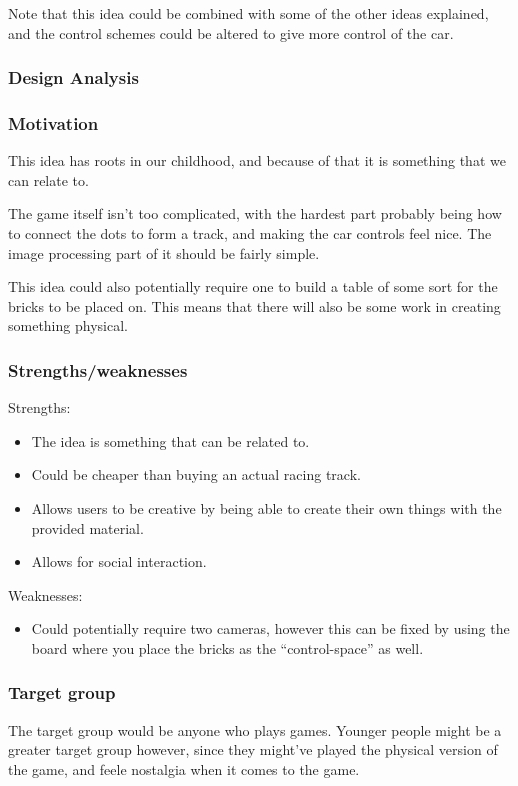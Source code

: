 Note that this idea could be combined with some of the other ideas explained, and the control schemes could be altered to give more control of the car.

\subsubsection*{Design Analysis}
\subsubsection*{Motivation}
This idea has roots in our childhood, and because of that it is something that we can relate to.

The game itself isn’t too complicated, with the hardest part probably being how to connect the dots to form a track, and making the car controls feel nice. The image processing part of it should be fairly simple.

This idea could also potentially require one to build a table of some sort for the bricks to be placed on. This means that there will also be some work in creating something physical.

\subsubsection*{Strengths/weaknesses}
Strengths:
\begin{itemize}
\item The idea is something that can be related to.
\item Could be cheaper than buying an actual racing track.
\item Allows users to be creative by being able to create their own things with the provided material.
\item Allows for social interaction.
\end{itemize}
Weaknesses:
\begin{itemize}
\item Could potentially require two cameras, however this can be fixed by using the board where you place the bricks as the “control-space” as well.
\end{itemize}

\subsubsection*{Target group}
The target group would be anyone who plays games. Younger people might be a greater target group however, since they might’ve played the physical version of the game, and feele nostalgia when it comes to the game.
\bigskip

